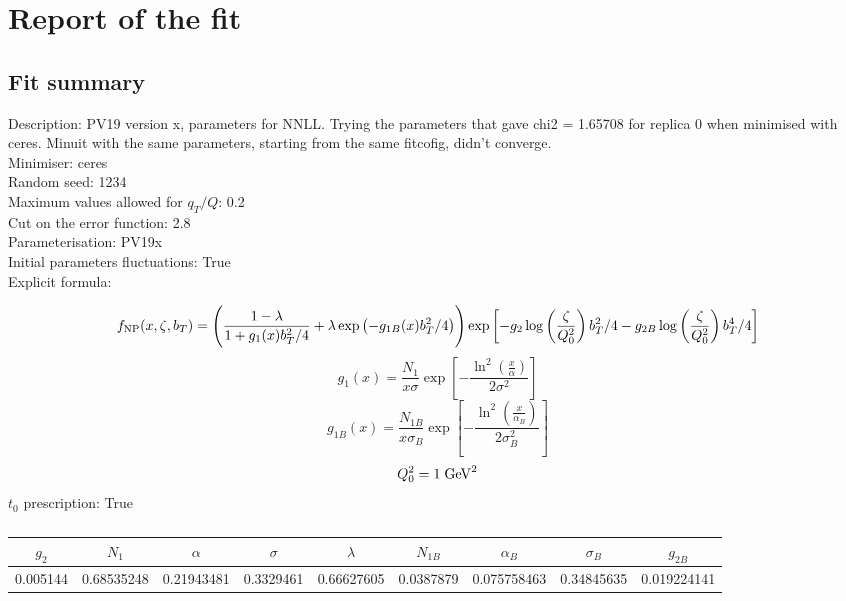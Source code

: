 \documentclass[
]{article}
\date{}
\begin{document}
\hypertarget{report-of-the-fit}{%
\section{Report of the fit}\label{report-of-the-fit}}

\hypertarget{fit-summary}{%
\subsection{Fit summary}\label{fit-summary}}

Description: PV19 version x, parameters for NNLL. Trying the parameters
that gave chi2 = 1.65708 for replica 0 when minimised with ceres. Minuit
with the same parameters, starting from the same fitcofig, didn't
converge.\\
Minimiser: ceres\\
Random seed: 1234\\
Maximum values allowed for \(q_T / Q\): 0.2\\
Cut on the error function: 2.8\\
Parameterisation: PV19x\\
Initial parameters fluctuations: True\\
Explicit formula:

\[f_{\rm NP}(x,\zeta, b_T)= \Biggl(
\frac{1-\lambda}{1 + g_1(x) b_T^2/4} + \lambda \exp \left(-g_{1B}(x) b_T^2 / 4 \right)\Biggr) \exp\left[- g_2 \log\left(\frac{\zeta}{Q_0^2}\right) b_T^2/4 - g_{2B} \log\left(\frac{\zeta}{Q_0^2}\right) b_T^4/4 \right]\]\[g_1(x) = \frac{N_1}{x\sigma} \exp\left[ - \frac{\ln^2\left(\frac{x}{\alpha}\right)}{2 \sigma^2} \right]\]\[g_{1B}(x) = \frac{N_{1B}}{x\sigma_B} \exp\left[ - \frac{\ln^2\left(\frac{x}{\alpha_B}\right)}{2 \sigma_B^2} \right]\]\[Q_0^2 = 1\;{\rm GeV}^2\]
\(t_0\) prescription: True

\begin{table}[h]

\centering

\begin{tabular}{|c|c|c|c|c|c|c|c|c|} \hline

\textbf{\(g_2\)} & \textbf{\(N_1\)} & \textbf{\(\alpha\)} & \textbf{\(\sigma\)} & \textbf{\(\lambda\)} & \textbf{\(N_{1B}\)} & \textbf{\(\alpha_B\)} & \textbf{\(\sigma_B\)} & \textbf{\(g_{2B}\)} \\ \hline

0.005144 & 0.68535248 & 0.21943481 & 0.3329461 & 0.66627605 & 0.0387879 & 0.075758463 & 0.34845635 & 0.019224141 \\ \hline

\end{tabular}

\caption{}

\end{table}
\end{document}
